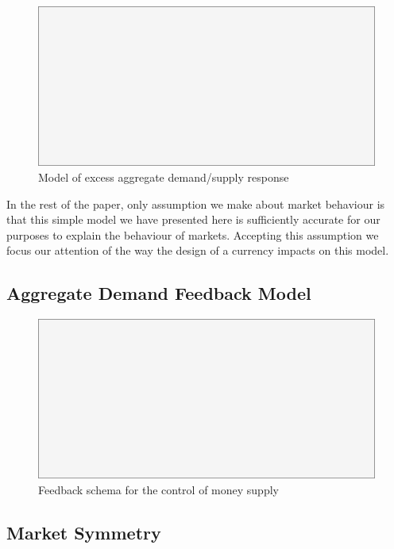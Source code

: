 \begin{figure}[H]
\centering
\includegraphics[scale=0.48]{blank}
\caption{Model of excess aggregate demand/supply response}
\label{fig:macro_feedback}
\end{figure}

In the rest of the paper, only assumption we make about market behaviour is that this simple model
we have presented here is sufficiently accurate for our purposes to explain the behaviour of
markets. Accepting this assumption we focus our attention of the way the design of a currency
impacts on this model.

\subsection{Aggregate Demand Feedback Model}

\begin{figure}[H]
\centering
\includegraphics[scale=0.48]{blank}
\caption{Feedback schema for the control of money supply}
\label{fig:money_supply_feedback}
\end{figure}

\subsection{Market Symmetry}

